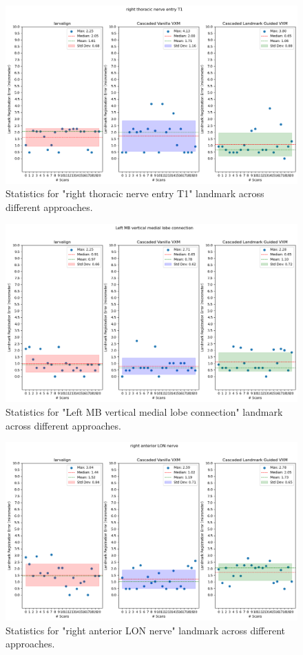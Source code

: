 \documentclass{report}
\begin{document}
\begin{figure}[h!]
	\centering
	\includegraphics[width=0.7\columnwidth]{resources/chapter5_fresh/output/right thoracic nerve entry T1.png}
	\caption{Statistics for "right thoracic nerve entry T1" landmark across different approaches.}
	\label{fig:landmark11}
\end{figure}

\begin{figure}[h!]
	\centering
	\includegraphics[width=0.7\columnwidth]{resources/chapter5_fresh/output/Left MB vertical medial lobe connection.png}
	\caption{Statistics for "Left MB vertical medial lobe connection" landmark across different approaches.}
	\label{fig:landmark12}
\end{figure}

\begin{figure}[h!]
	\centering
	\includegraphics[width=0.7\columnwidth]{resources/chapter5_fresh/output/right anterior LON nerve.png}
	\caption{Statistics for "right anterior LON nerve" landmark across different approaches.}
	\label{fig:landmark13}
\end{figure}
\end{document}
